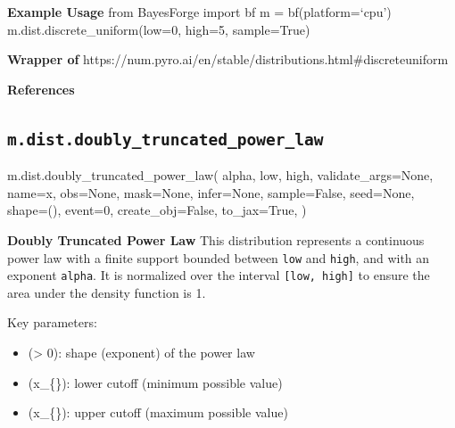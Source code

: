 \documentclass[
  letterpaper,
  DIV=11,
  numbers=noendperiod]{scrartcl}
\newenvironment{Shaded}{\begin{snugshade}}{\end{snugshade}}
\newcommand{\DecValTok}[1]{\textcolor[rgb]{0.68,0.00,0.00}{#1}}
\newcommand{\NormalTok}[1]{\textcolor[rgb]{0.00,0.23,0.31}{#1}}
\newcommand{\OperatorTok}[1]{\textcolor[rgb]{0.37,0.37,0.37}{#1}}
\newcommand{\StringTok}[1]{\textcolor[rgb]{0.13,0.47,0.30}{#1}}
\newcommand{\VariableTok}[1]{\textcolor[rgb]{0.07,0.07,0.07}{#1}}
\providecommand{\tightlist}{%
  \setlength{\itemsep}{0pt}\setlength{\parskip}{0pt}}\usepackage{longtable,booktabs,array}
\begin{document}
\textbf{Example Usage} from BayesForge import bf m = bf(platform=`cpu')
m.dist.discrete\_uniform(low=0, high=5, sample=True)

\textbf{Wrapper of}
https://num.pyro.ai/en/stable/distributions.html\#discreteuniform

\textbf{References}

\subsection{\texorpdfstring{\texttt{m.dist.doubly\_truncated\_power\_law}}{m.dist.doubly\_truncated\_power\_law}}\label{doubly_truncated_power_law}

\begin{Shaded}
\begin{Highlighting}[]
\NormalTok{m.dist.doubly\_truncated\_power\_law(}
\NormalTok{    alpha,}
\NormalTok{    low,}
\NormalTok{    high,}
\NormalTok{    validate\_args}\OperatorTok{=}\VariableTok{None}\NormalTok{,}
\NormalTok{    name}\OperatorTok{=}\StringTok{\textquotesingle{}x\textquotesingle{}}\NormalTok{,}
\NormalTok{    obs}\OperatorTok{=}\VariableTok{None}\NormalTok{,}
\NormalTok{    mask}\OperatorTok{=}\VariableTok{None}\NormalTok{,}
\NormalTok{    infer}\OperatorTok{=}\VariableTok{None}\NormalTok{,}
\NormalTok{    sample}\OperatorTok{=}\VariableTok{False}\NormalTok{,}
\NormalTok{    seed}\OperatorTok{=}\VariableTok{None}\NormalTok{,}
\NormalTok{    shape}\OperatorTok{=}\NormalTok{(),}
\NormalTok{    event}\OperatorTok{=}\DecValTok{0}\NormalTok{,}
\NormalTok{    create\_obj}\OperatorTok{=}\VariableTok{False}\NormalTok{,}
\NormalTok{    to\_jax}\OperatorTok{=}\VariableTok{True}\NormalTok{,}
\NormalTok{)}
\end{Highlighting}
\end{Shaded}

\textbf{Doubly Truncated Power Law} This distribution represents a
continuous power law with a finite support bounded between \texttt{low}
and \texttt{high}, and with an exponent \texttt{alpha}. It is normalized
over the interval \texttt{{[}low,\ high{]}} to ensure the area under the
density function is 1.

Key parameters:

\begin{itemize}
\tightlist
\item
  (\alpha \textgreater{} 0): shape (exponent) of the power law
\item
  (x\_\{\min\}): lower cutoff (minimum possible value)
\item
  (x\_\{\max\}): upper cutoff (maximum possible value)
\end{itemize}
\end{document}

